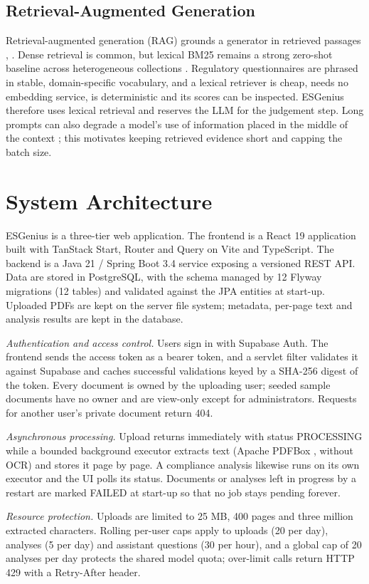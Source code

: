 \documentclass[conference]{IEEEtran}
\begin{document}
\subsection{Retrieval-Augmented Generation}
Retrieval-augmented generation (RAG) grounds a generator in retrieved passages \cite{b3}, \cite{b4}. Dense retrieval is common, but lexical BM25 \cite{b2} remains a strong zero-shot baseline across heterogeneous collections \cite{b8}. Regulatory questionnaires are phrased in stable, domain-specific vocabulary, and a lexical retriever is cheap, needs no embedding service, is deterministic and its scores can be inspected. ESGenius therefore uses lexical retrieval and reserves the LLM for the judgement step. Long prompts can also degrade a model's use of information placed in the middle of the context \cite{b9}; this motivates keeping retrieved evidence short and capping the batch size.

\section{System Architecture}
ESGenius is a three-tier web application. The frontend is a React 19 application built with TanStack Start, Router and Query on Vite and TypeScript. The backend is a Java 21 / Spring Boot 3.4 service exposing a versioned REST API. Data are stored in PostgreSQL, with the schema managed by 12 Flyway migrations (12 tables) and validated against the JPA entities at start-up. Uploaded PDFs are kept on the server file system; metadata, per-page text and analysis results are kept in the database.

\textit{Authentication and access control.} Users sign in with Supabase Auth. The frontend sends the access token as a bearer token, and a servlet filter validates it against Supabase and caches successful validations keyed by a SHA-256 digest of the token. Every document is owned by the uploading user; seeded sample documents have no owner and are view-only except for administrators. Requests for another user's private document return 404.

\textit{Asynchronous processing.} Upload returns immediately with status PROCESSING while a bounded background executor extracts text (Apache PDFBox \cite{b12}, without OCR) and stores it page by page. A compliance analysis likewise runs on its own executor and the UI polls its status. Documents or analyses left in progress by a restart are marked FAILED at start-up so that no job stays pending forever.

\textit{Resource protection.} Uploads are limited to 25 MB, 400 pages and three million extracted characters. Rolling per-user caps apply to uploads (20 per day), analyses (5 per day) and assistant questions (30 per hour), and a global cap of 20 analyses per day protects the shared model quota; over-limit calls return HTTP 429 with a Retry-After header.
\end{document}

